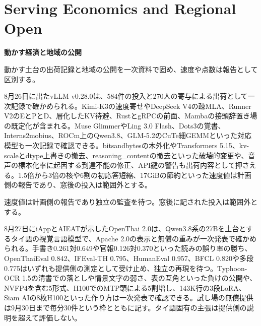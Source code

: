 \section{Serving Economics and Regional Open}
\begin{wideflow}
{\Large\bfseries 動かす経済と地域の公開}\par
\smallskip
{\color{SurveyMuted}動かす土台の出荷記録と地域の公開を一次資料で固め、速度や点数は報告として区別する。}\par
\end{wideflow}

8月26日に出たvLLM v0.28.0は、584件の投入と270人の寄与による出荷として一次記録で確かめられる\cite{vllm028}。Kimi-K3の速度寄せやDeepSeek V4の疎MLA、Runner V2のEとPとD、層化したKV待避、RustとgRPCの前面、Mambaの接頭辞置き場の既定化が含まれる。Muse GlimmerやLing 3.0 Flash、Dots3の覚書、Interns2mobius、ROCm上のQwen3.8、GLM-5.2のCuTe細GEMMといった対応模型も一次記録で確認できる。bitsandbytesの木外化やTransformers 5.15、kv-scaleとdtype上書きの撤去、reasoning\_contentの撤去といった破壊的変更や、音声の標本化率に起因する到達不能の修正、API鍵の警告も出荷内容として押さえる。1.5倍から3倍の核や6割の初応答短縮、17GiBの節約といった速度値は計画側の報告であり、窓後の投入は範囲外とする。

\begin{claimboundary}[未解決の境界]
速度値は計画側の報告であり独立の監査を待つ。窓後に記された投入は範囲外とする。
\end{claimboundary}

8月27日にiAppとAIEATが示したOpenThai 2.0は、Qwen3.8系の27Bを土台とするタイ語の視覚言語模型で、Apache 2.0の表示と無償の重みが一次発表で確かめられる\cite{openthai20}。手書き0.261対0.649や官報0.126対0.370といった読みの誤り率の勝ち、OpenThaiEval 0.842、IFEval-TH 0.795、HumanEval 0.957、BFCL 0.820や多段0.775はいずれも提供側の測定として受け止め、独立の再現を待つ。Typhoon-OCR 1.5の清書での落としや情景文字の弱さ、表の互角といった負けの公開や、NVFP4を含む5形式、H100でのMTP頭による5割増し、143K行の3段LoRA、Siam AIの8枚H100といった作り方は一次発表で確認できる。試し場の無償提供は9月30日まで毎分30件という枠とともに記す。タイ語固有の主張は提供側の説明を超えて評価しない。
